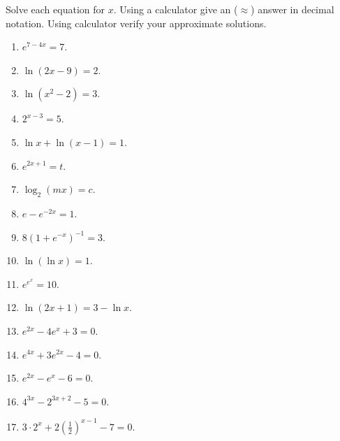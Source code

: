 Solve each equation for $x$. Using a calculator give an ($\approx$) answer in decimal notation. Using calculator verify your approximate solutions.
\begin{multicols}{2}
\begin{enumerate}[ref={\fcProblemRef}]
\item $e^{7-4x}=7$.

\item $\ln (2x-9)=2$.

\item $\ln (x^2-2)=3$.

\item $2^{x-3}=5$.

\item \label{problemlnx+ln(x-1)=1} $\ln x+\ln (x-1)=1$.

\item $e^{2x+1}=t$.

\item $\log_2(m x)=c$.

\item \label{probleme-e^(-2x)=1} $e- e^{-2x}=1$.

\item $8(1+e^{-x})^{-1}=3$.

\item $\ln (\ln x)=1$.

\item $e^{e^x}=10$.

\item $\ln(2x+1)=3-\ln x$.

\item $e^{2x}-4e^x+3=0$.


\item $e^{4x}+3e^{2x}-4=0$. 

\item $e^{2x}-e^x-6=0$.

\item $4^{3x}-2^{3x+2}-5=0$. 

\item $3\cdot 2^{x}+2 \left(\frac{1}{2}\right)^{x-1}-7=0$. 

\end{enumerate}
\end{multicols}

